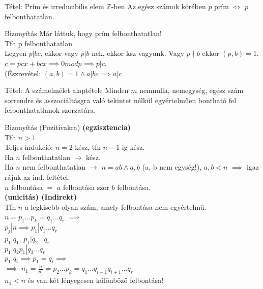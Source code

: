 \documentclass{beamer}
\begin{document}
\begin{frame}

\begin{block}{Tétel: Prím és irreducibilis elem $\mathbb{Z}$-ben}
Az egész számok körében $p$ prím $\iff$ $p$ felbonthatatlan.
\end{block}

\begin{block}{Bizonyítás}
Már láttuk, hogy prím felbonthatatlan!\\
Tfh p felbonthatatlan\\
Legyen $p|bc$, ekkor vagy $p | b$-nek, ekkor ksz vagyunk.
Vagy $p \nmid b$ ekkor $(p,b) = 1$.\\
$c = pcx +bcx \implies 0 mod p \implies p | c$.\\
(Észrevétel: $(a, b) = 1 \land a | bc \implies a | c$

\end{block}

\end{frame}

\begin{frame}

\begin{block}{Tétel: A számelmélet alaptétele}
Minden $m$ nemnulla, nemegység, egész szám sorrendre és asszociáltásgra való tekintet nélkül egyértelműen bontható fel felbonthatatlanok szorzatára.
\end{block}

\begin{block}{Bizonyítás (Pozitívakra)}
\textbf{(egzisztencia)}\\
Tfh $n > 1$\\
Teljes indukció: $n = 2$ kész, tfk $n - 1$-ig kész.\\
Ha $n$ felbonthatatlan $\rightarrow$ kész.\\
Ha $n$ nem felbonthatatlan $\rightarrow$ $n = ab \land a, b$ (a, b nem egység!), $a, b < n$ $\implies$ igaz rájuk az ind. feltétel.\\
$n$ felbontása $=$ $a$ felbontása szor $b$ felbontása.\\
\bigskip
\textbf{(unicitás) (Indirekt)}\\
Tfh $n$ a legkisebb olyan szám, amely felbontása nem egyértelmű.\\
$n = p_1 ... p_k = q_1 ... q_r$ $\implies$\\
$p_j|n \implies p_1|q_1 ... q_r$\\
$p_1|q_1$, $p_1|q_2 ... q_r$\\
           $p_1|q_2   p_1|q_3 ... q_r$\\
                      $p_1|q_i  \implies p_1 = q_i \implies$\\
$\implies$ $n_1 = \frac{n}{p_1} = p_2 ... p_k = q_1 ... q_{i-1}q_{i+1} ... q_r$\\
$n_1 < n$ és van két lényegesen különböző felbontása!
\end{block}

\end{frame}
\end{document}
